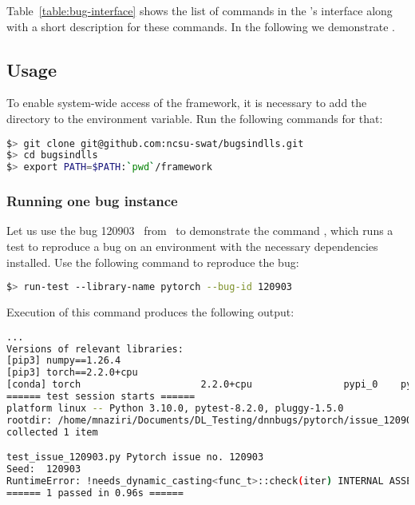 \documentclass[sigconf,screen]{acmart}
\begin{document}
Table~\ref{table:bug-interface} shows the list of commands in the
\tname's interface along with a short description for these
commands. In the following we demonstrate \tname.

\subsection{Usage}
\label{sec:usage}

To enable system-wide access of the framework, it is necessary to add
the directory  to the  environment
variable. Run the following commands for that:

\begin{lstlisting}[language=bash]
$> git clone git@github.com:ncsu-swat/bugsindlls.git
$> cd bugsindlls
$> export PATH=$PATH:`pwd`/framework
\end{lstlisting}


\subsubsection{Running one bug instance}



Let us use the bug 120903~\cite{torch120903} from \torch\ to demonstrate the
command , which runs a test to reproduce a bug on an
environment with the necessary dependencies installed. Use the
following command to reproduce the bug:

\begin{lstlisting}[language=bash]
$> run-test --library-name pytorch --bug-id 120903
\end{lstlisting}

\noindent
Execution of this command produces the following output:

\begin{lstlisting}[language=bash]
... 
Versions of relevant libraries:
[pip3] numpy==1.26.4
[pip3] torch==2.2.0+cpu
[conda] torch                     2.2.0+cpu                pypi_0    pypi
====== test session starts ======
platform linux -- Python 3.10.0, pytest-8.2.0, pluggy-1.5.0
rootdir: /home/mnaziri/Documents/DL_Testing/dnnbugs/pytorch/issue_120903
collected 1 item                                                                            

test_issue_120903.py Pytorch issue no. 120903
Seed:  120903
RuntimeError: !needs_dynamic_casting<func_t>::check(iter) INTERNAL ASSERT FAILED at "../aten/src/ATen/native/cpu/Loops.h":310, please report a bug to PyTorch. 
====== 1 passed in 0.96s ======
\end{lstlisting}
\end{document}

